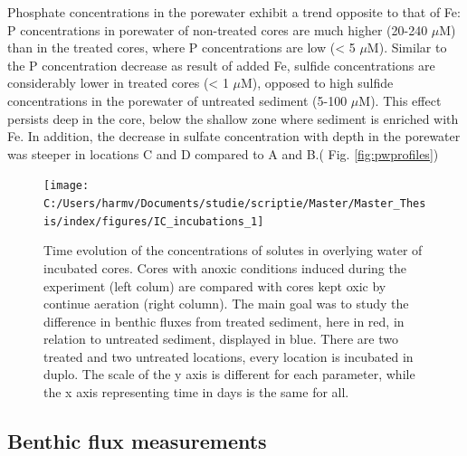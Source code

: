 \documentclass[a4paper,11pt]{article}
\begin{document}
Phosphate concentrations in the porewater exhibit a trend opposite to that of Fe: P concentrations in porewater of non-treated cores are much higher (20-240 \(\mu\)M) than in the treated cores, where P concentrations are low (\textless{} 5 \(\mu\)M). Similar to the P concentration decrease as result of added Fe, sulfide concentrations are considerably lower in treated cores (\textless{} 1 \(\mu\)M), opposed to high sulfide concentrations in the porewater of untreated sediment (5-100 \(\mu\)M). This effect persists deep in the core, below the shallow zone where sediment is enriched with Fe.
In addition, the decrease in sulfate concentration with depth in the porewater was steeper in locations C and D compared to A and B.( Fig. \ref{fig:pwprofiles})
\begin{figure}

{\centering \texttt{[image: C:/Users/harmv/Documents/studie/scriptie/Master/Master\_Thesis/index/figures/IC\_incubations\_1]} 

}

\caption{Time evolution of the concentrations of solutes in overlying water of incubated cores. Cores with anoxic conditions induced during the experiment (left colum) are compared with cores kept oxic by continue aeration (right column). The main goal was to study the difference in benthic fluxes from treated sediment, here in red, in relation to untreated sediment, displayed in blue. There are two treated and two untreated locations,  every location is incubated in duplo. The scale of the y axis is different for each parameter, while the x axis representing time in days is the same for all.}\label{fig:incubations}
\end{figure}
\hypertarget{benthic-flux-measurements}{%
\subsection{Benthic flux measurements}\label{benthic-flux-measurements}}
\end{document}
